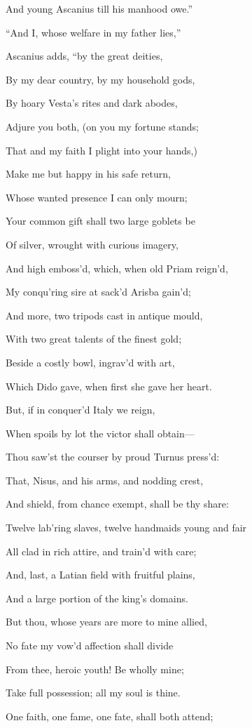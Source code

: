 And young Ascanius till his manhood owe.”

“And I, whose welfare in my father lies,”

Ascanius adds, “by the great deities,

By my dear country, by my household gods,

By hoary Vesta’s rites and dark abodes,

Adjure you both, (on you my fortune stands;

That and my faith I plight into your hands,)

Make me but happy in his safe return,

Whose wanted presence I can only mourn;

Your common gift shall two large goblets be

Of silver, wrought with curious imagery,

And high emboss’d, which, when old Priam reign’d,

My conqu’ring sire at sack’d Arisba gain’d;

And more, two tripods cast in antique mould,

With two great talents of the finest gold;

Beside a costly bowl, ingrav’d with art,

Which Dido gave, when first she gave her heart.

But, if in conquer’d Italy we reign,

When spoils by lot the victor shall obtain—

Thou saw’st the courser by proud Turnus press’d:

That, Nisus, and his arms, and nodding crest,

And shield, from chance exempt, shall be thy share:

Twelve lab’ring slaves, twelve handmaids young and fair

All clad in rich attire, and train’d with care;

And, last, a Latian field with fruitful plains,

And a large portion of the king’s domains.

But thou, whose years are more to mine allied,

No fate my vow’d affection shall divide

From thee, heroic youth! Be wholly mine;

Take full possession; all my soul is thine.

One faith, one fame, one fate, shall both attend;

